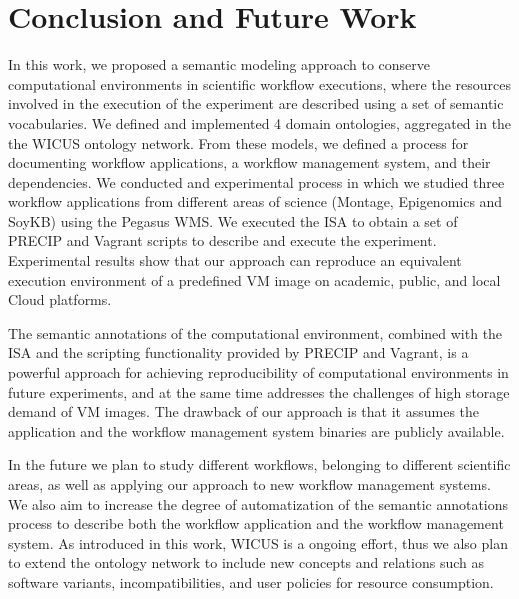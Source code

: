 \section{Conclusion and Future Work}
\label{sec:conclusion}


In this work, we proposed a semantic modeling approach to conserve computational environments in scientific workflow executions, where  the resources involved in the execution of the experiment are described using a set of semantic vocabularies. We defined and implemented 4 domain ontologies, aggregated in the the WICUS ontology network. From these models, we defined a process for documenting workflow applications, a workflow management system, and their dependencies. We conducted and experimental process in which we studied three workflow applications from different areas of science (Montage, Epigenomics and SoyKB) using the Pegasus WMS. We executed the ISA to obtain a set of PRECIP and Vagrant scripts to describe and execute the experiment. Experimental results show that our approach can reproduce an equivalent execution environment of a predefined VM image on academic, public, and local Cloud platforms.

The semantic annotations of the computational environment, combined with the ISA and the scripting functionality provided by PRECIP and Vagrant, is a powerful approach for achieving reproducibility of computational environments in future experiments, and at the same time addresses the challenges of high storage demand of VM images. The drawback of our approach is that it assumes the application and the workflow management system binaries are publicly available.

In the future we plan to study different workflows, belonging to different scientific areas, as well as applying our approach to new workflow management systems. We also aim to increase the degree of automatization of the semantic annotations process to describe both the workflow application and the workflow management system. As introduced in this work, WICUS is a ongoing effort, thus we also plan to extend the ontology network to include new concepts and relations such as software variants, incompatibilities, and user policies for resource consumption.